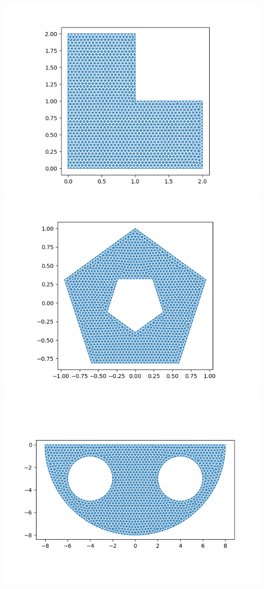 \documentclass{article}
\newcommand{\sep}[1][.5cm]{\vspace{#1}}
\begin{document}
\begin{enumerate}
\includegraphics[scale=.35]{hw7 q3 shape 1}
\includegraphics[scale=.35]{hw7 q3 shape 2}
\includegraphics[scale=.35]{hw7 q3 shape 3}
\sep




\end{enumerate}
\end{document}
